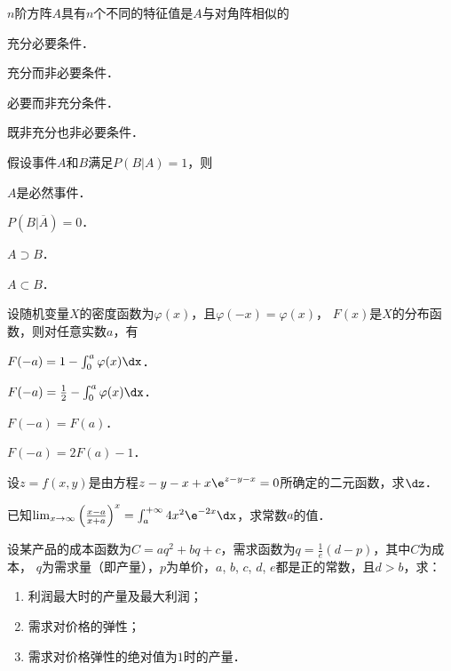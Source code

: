 \documentclass[plain,noanswer,medmath]{../../template/jnuexam}
\begin{document}
\begin{problem}
$n$阶方阵$A$具有$n$个不同的特征值是$A$与对角阵相似的\pickout{}
\begin{abcd}
\item 充分必要条件．					
\item 充分而非必要条件．
\item 必要而非充分条件．				
\item 既非充分也非必要条件．
\end{abcd}
\end{problem}


\begin{problem}
假设事件$A$和$B$满足$P(B|A) = 1$，则\pickout{}
\begin{abcd}
\item $A$是必然事件．					
\item $P(B|\overline{A}) = 0$．
\item $A \supset B$．							
\item $A \subset B$．
\end{abcd}
\end{problem}


\begin{problem}
设随机变量$X$的密度函数为$\varphi (x)$，且$\varphi(-x)=\varphi(x)$，
$F(x)$是$X$的分布函数，则对任意实数$a$，有\pickout{}
\begin{abcd}
\item $F(- a) = 1 - \int_0^a \varphi(x)\dx$．
\item $F(- a) = \frac{1}{2} - \int_0^a \varphi(x)\dx$．
\item $F(- a) = F(a)$．
\item $F(- a) = 2F(a) - 1$．
\end{abcd}
\end{problem}



\begin{problem}
设$z = f\left(x,y \right)$是由方程$z - y - x + x\e^{z - y - x} = 0$所确定的二元函数，求$\dz$．
\end{problem}



\begin{problem}
已知$\lim_{x \to \infty} \left(\frac{x - a}{x + a} \right)^x
= \int_a^{+\infty} 4x^2\e^{- 2x} \dx$，求常数$a$的值．
\end{problem}



\begin{problem}
设某产品的成本函数为$C = aq^2 + bq + c$，需求函数为$q = \frac{1}{e}(d - p)$，其中$C$为成本，
$q$为需求量（即产量），$p$为单价，$a$, $b$, $c$, $d$, $e$都是正的常数，且$d > b$，求：
\begin{enumerate}
\item 利润最大时的产量及最大利润；
\item 需求对价格的弹性；
\item 需求对价格弹性的绝对值为$1$时的产量．
\end{enumerate}
\end{problem}
\end{document}
